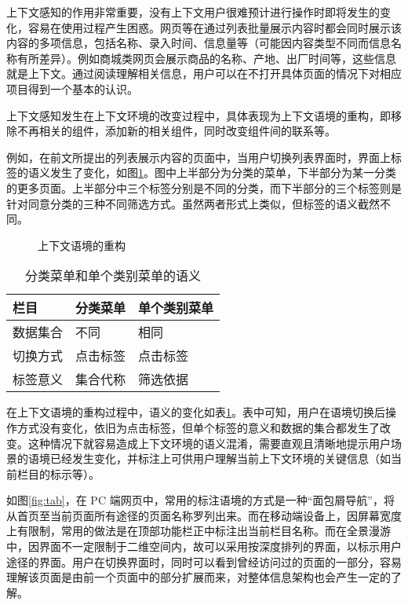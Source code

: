 上下文感知的作用非常重要，没有上下文用户很难预计进行操作时即将发生的变化，容易在使用过程产生困惑。网页等在通过列表批量展示内容时都会同时展示该内容的多项信息，包括名称、录入时间、信息量等（可能因内容类型不同而信息名称有所差异）。例如商城类网页会展示商品的名称、产地、出厂时间等，这些信息就是上下文。通过阅读理解相关信息，用户可以在不打开具体页面的情况下对相应项目得到一个基本的认识。

上下文感知发生在上下文环境的改变过程中，具体表现为上下文语境的重构，即移除不再相关的组件，添加新的相关组件，同时改变组件间的联系等。

例如，在前文所提出的列表展示内容的页面中，当用户切换列表界面时，界面上标签的语义发生了变化，如图\ref{fig:context}。图中上半部分为分类的菜单，下半部分为某一分类的更多页面。上半部分中三个标签分别是不同的分类，而下半部分的三个标签则是针对同意分类的三种不同筛选方式。虽然两者形式上类似，但标签的语义截然不同。

\begin{figure}[htp]
\centering
{}
\caption{上下文语境的重构}
\label{fig:context}
\end{figure}

\begin{table}[htbp]
\centering
\caption{分类菜单和单个类别菜单的语义}
\vskip 5pt
\begin{tabular}{lll}
\toprule
栏目 & 分类菜单 & 单个类别菜单 \\
\midrule
数据集合 & 不同 & 相同 \\
切换方式  & 点击标签 & 点击标签 \\
标签意义 & 集合代称 & 筛选依据 \\
\bottomrule
\end{tabular}
\label{tab:collection}
\end{table}

在上下文语境的重构过程中，语义的变化如表\ref{tab:collection}。表中可知，用户在语境切换后操作方式没有变化，依旧为点击标签，但单个标签的意义和数据的集合都发生了改变。这种情况下就容易造成上下文环境的语义混淆，需要直观且清晰地提示用户场景的语境已经发生变化，并标注上可供用户理解当前上下文环境的关键信息（如当前栏目的标示等）。

如图\ref{fig:tab}，在 PC 端网页中，常用的标注语境的方式是一种“面包屑导航”，将从首页至当前页面所有途径的页面名称罗列出来。而在移动端设备上，因屏幕宽度上有限制，常用的做法是在顶部功能栏正中标注出当前栏目名称。而在全景漫游中，因界面不一定限制于二维空间内，故可以采用按深度排列的界面，以标示用户途径的界面。用户在切换界面时，同时可以看到曾经访问过的页面的一部分，容易理解该页面是由前一个页面中的部分扩展而来，对整体信息架构也会产生一定的了解。

